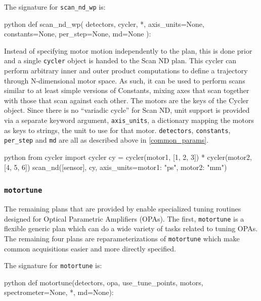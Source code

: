 The signature for \texttt{scan\_nd\_wp} is:

\begin{codefragment}{python}
def scan_nd_wp(
    detectors, cycler, *, axis_units=None, constants=None, per_step=None, md=None
):
\end{codefragment}

Instead of specifying motor motion independently to the plan, this is done prior and a single \texttt{cycler}\cite{} object is handed to the Scan ND plan.
This cycler can perform arbitrary inner and outer product computations to define a trajectory through N-dimensional motor space.
As such, it can be used to perform scans similar to at least simple versions of Constants, mixing axes that scan together with those that scan against each other.
The motors are the keys of the Cycler object.
Since there is no ``variadic cycle'' for Scan ND, \wrightplans unit support is provided via a separate keyword argument, \texttt{axis\_units}, a dictionary mapping the motors as keys to strings, the unit to use for that motor.
\texttt{detectors}, \texttt{constants}, \texttt{per\_step} and \texttt{md} are all as described above in \ref{common_params}.

\begin{codefragment}{python}
from cycler import cycler
cy = cycler(motor1, [1, 2, 3]) * cycler(motor2, [4, 5, 6])
scan_nd([sensor], cy, axis_units={motor1: "ps", motor2: "mm"})
\end{codefragment}


\subsubsection{\texttt{motortune}}

The remaining plans that are provided by \wrightplans enable specialized tuning routines designed for Optical Parametric Amplifiers (OPAs).
The first, \texttt{motortune} is a flexible generic plan which can do a wide variety of tasks related to tuning OPAs.
The remaining four plans are reparameterizations of \texttt{motortune} which make common acquisitions easier and more directly specified.

The signature for \texttt{motortune} is:

\begin{codefragment}{python}
def motortune(detectors, opa, use_tune_points, motors, spectrometer=None, *, md=None):
\end{codefragment}

